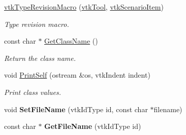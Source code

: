 \begin{DoxyCompactItemize}
\item 
\hypertarget{classvtkTool_afd4b5a15701d73c9ea10dd86960ff180}{
\hyperlink{classvtkTool_afd4b5a15701d73c9ea10dd86960ff180}{vtkTypeRevisionMacro} (\hyperlink{classvtkTool}{vtkTool}, \hyperlink{classvtkScenarioItem}{vtkScenarioItem})}
\label{classvtkTool_afd4b5a15701d73c9ea10dd86960ff180}

\begin{DoxyCompactList}\small\item\em Type revision macro. \item\end{DoxyCompactList}\item 
\hypertarget{classvtkTool_a36e7d337037abb2ba43ec2b5bea26bfc}{
const char $\ast$ \hyperlink{classvtkTool_a36e7d337037abb2ba43ec2b5bea26bfc}{GetClassName} ()}
\label{classvtkTool_a36e7d337037abb2ba43ec2b5bea26bfc}

\begin{DoxyCompactList}\small\item\em Return the class name. \item\end{DoxyCompactList}\item 
\hypertarget{classvtkTool_a9858b0b58f68255aa112301628e9a32d}{
void \hyperlink{classvtkTool_a9858b0b58f68255aa112301628e9a32d}{PrintSelf} (ostream \&os, vtkIndent indent)}
\label{classvtkTool_a9858b0b58f68255aa112301628e9a32d}

\begin{DoxyCompactList}\small\item\em Print class values. \item\end{DoxyCompactList}\item 
\hypertarget{classvtkTool_a47c15af2e5a24c7931621ab49aff0876}{
void {\bfseries SetFileName} (vtkIdType id, const char $\ast$filename)}
\label{classvtkTool_a47c15af2e5a24c7931621ab49aff0876}

\item 
\hypertarget{classvtkTool_a5ed1a313cc4e75648ea2bea6362465ce}{
const char $\ast$ {\bfseries GetFileName} (vtkIdType id)}
\label{classvtkTool_a5ed1a313cc4e75648ea2bea6362465ce}


\end{DoxyCompactItemize}
